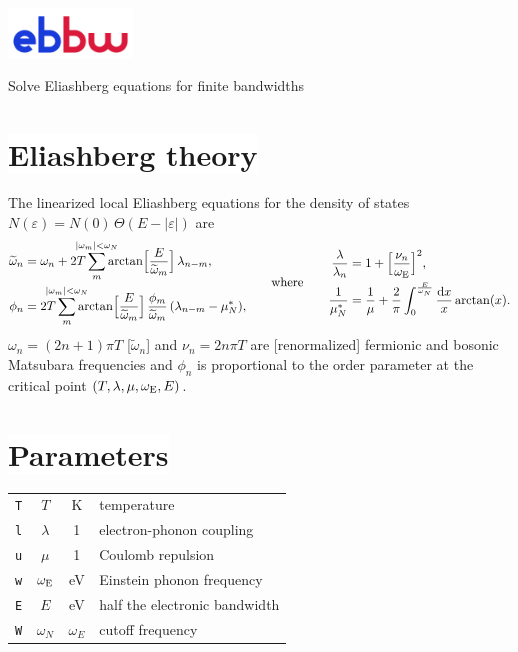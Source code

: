 \documentclass[a4paper]{article}
\def\D{\mathrm d}
\def\sub#1{\sb{\mathrm{#1}}}
\def\limit#1{\sp{\mathclap{#1}}}
\let\tilde\widetilde
\let\epsilon\varepsilon
\let\Theta\varTheta
\def\headline#1{\section*{\normalsize\normalfont%
   \rlap{\rule[0.5ex]{\textwidth}{0.4pt}}\qquad\colorbox{white}{#1}}}
\begin{document}
   \begin{center}
      \includegraphics[width=33mm]{../logo/ebbw} \par \bigskip
      \large Solve Eliashberg equations for finite bandwidths
   \end{center}

   \headline{Eliashberg theory}

   The linearized local Eliashberg equations for the density of states
   $N(\epsilon) = N(0) \, \Theta(E - |\epsilon|)$ are
   \begin{align*}
      \begin{aligned}
         \tilde \omega_n &= \omega_n + 2 T \sum_m \limit{|\omega_m| < \omega_N}
         \arctan \Bigl[ \frac E {\tilde \omega_m} \Bigr] \, \lambda_{n - m},
         \\
         \phi_n &= 2 T \sum_m \limit{|\omega_m| < \omega_N}
         \arctan \Bigl[ \frac E {\tilde \omega_m} \Bigr] \,
         \frac{\phi_m}{\tilde \omega_m} \, (\lambda_{n - m} - \mu^*_N),
      \end{aligned}
      \qquad \text{where} \qquad
      \begin{aligned}
         \frac \lambda {\lambda_n} &=
         1 + \Bigl[ \frac{\nu_n}{\omega \sub E} \Bigr]^2,
         \\
         \frac 1 {\mu^*_N} &=
         \frac 1 \mu + \frac 2 \pi \int_0^{\frac E {\omega_N}} \frac {\D x} x
         \arctan(x).
      \end{aligned}
   \end{align*}
   $\omega_n = (2 n + 1) \pi T$ [$\tilde \omega_n$] and $\nu_n = 2 n \pi T$ are
   [renormalized] fermionic and bosonic Matsubara frequencies and $\phi_n$ is
   proportional to the order parameter at the critical point $(T, \lambda, \mu,
   \omega \sub E, E)$.

   \headline{Parameters}

   \begin{center}
      \begin{tabular}{r c c l}
         \verb|T| & $T$ & K & temperature \\
         \verb|l| & $\lambda$ & 1 & electron-phonon coupling \\
         \verb|u| & $\mu$ & 1 & Coulomb repulsion \\
         \verb|w| & $\omega \sub E$ & eV & Einstein phonon frequency \\
         \verb|E| & $E$ & eV & half the electronic bandwidth \\
         \verb|W| & $\omega_N$ & $\omega_E$ & cutoff frequency
      \end{tabular}
   \end{center}
\end{document}
